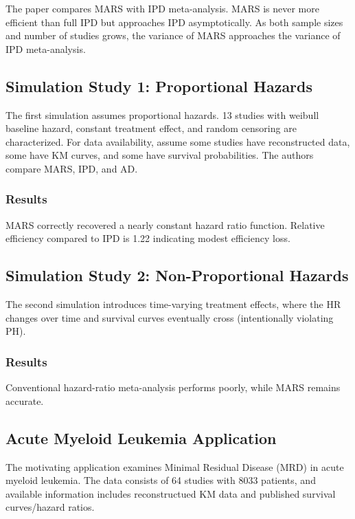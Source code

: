 \documentclass[11pt]{article}
\begin{document}
The paper compares MARS with IPD meta-analysis. MARS is never more efficient than full IPD but approaches IPD asymptotically. As both sample sizes and number of studies grows, the variance of MARS approaches the variance of IPD meta-analysis.

\subsection*{Simulation Study 1: Proportional Hazards}

The first simulation assumes proportional hazards. 13 studies with weibull baseline hazard, constant treatment effect, and random censoring are characterized. For data availability, assume some studies have reconstructed data, some have KM curves, and some have survival probabilities. The authors compare MARS, IPD, and AD.

\subsubsection*{Results}

MARS correctly recovered a nearly constant hazard ratio function. Relative efficiency compared to IPD is 1.22 indicating modest efficiency loss.

\subsection*{Simulation Study 2: Non-Proportional Hazards}

The second simulation introduces time-varying treatment effects, where the HR changes over time and survival curves eventually cross (intentionally violating PH).

\subsubsection*{Results}

Conventional hazard-ratio meta-analysis performs poorly, while MARS remains accurate.

\subsection*{Acute Myeloid Leukemia Application}

The motivating application examines Minimal Residual Disease (MRD) in acute myeloid leukemia. The data consists of 64 studies with 8033 patients, and available information includes reconstructued KM data and published survival curves/hazard ratios.
\end{document}
